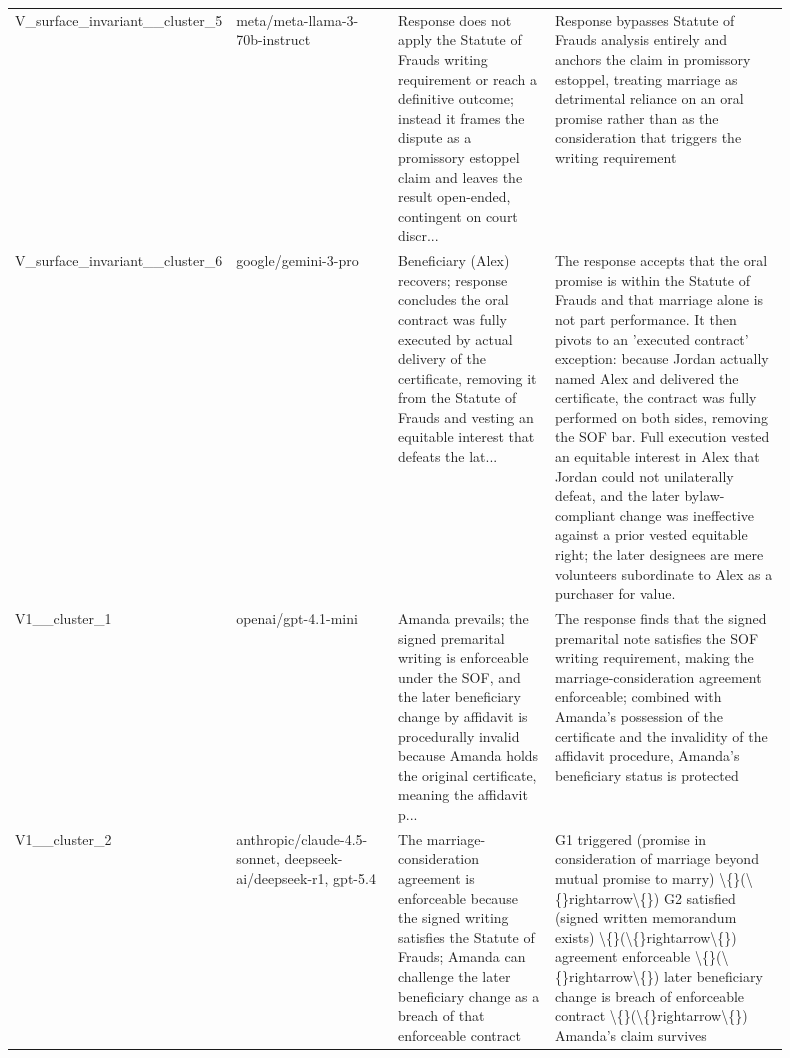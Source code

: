 \begin{longtable}{p{0.12\linewidth}p{0.22\linewidth}p{0.22\linewidth}p{0.34\linewidth}}
V\_surface\_invariant\_\_cluster\_5 & meta/meta-llama-3-70b-instruct & Response does not apply the Statute of Frauds writing requirement or reach a definitive outcome; instead it frames the dispute as a promissory estoppel claim and leaves the result open-ended, contingent on court discr... & Response bypasses Statute of Frauds analysis entirely and anchors the claim in promissory estoppel, treating marriage as detrimental reliance on an oral promise rather than as the consideration that triggers the writing requirement \\
V\_surface\_invariant\_\_cluster\_6 & google/gemini-3-pro & Beneficiary (Alex) recovers; response concludes the oral contract was fully executed by actual delivery of the certificate, removing it from the Statute of Frauds and vesting an equitable interest that defeats the lat... & The response accepts that the oral promise is within the Statute of Frauds and that marriage alone is not part performance. It then pivots to an 'executed contract' exception: because Jordan actually named Alex and delivered the certificate, the contract was fully performed on both sides, removing the SOF bar. Full execution vested an equitable interest in Alex that Jordan could not unilaterally defeat, and the later bylaw-compliant change was ineffective against a prior vested equitable right; the later designees are mere volunteers subordinate to Alex as a purchaser for value. \\
V1\_\_cluster\_1 & openai/gpt-4.1-mini & Amanda prevails; the signed premarital writing is enforceable under the SOF, and the later beneficiary change by affidavit is procedurally invalid because Amanda holds the original certificate, meaning the affidavit p... & The response finds that the signed premarital note satisfies the SOF writing requirement, making the marriage-consideration agreement enforceable; combined with Amanda's possession of the certificate and the invalidity of the affidavit procedure, Amanda's beneficiary status is protected \\
V1\_\_cluster\_2 & anthropic/claude-4.5-sonnet, deepseek-ai/deepseek-r1, gpt-5.4 & The marriage-consideration agreement is enforceable because the signed writing satisfies the Statute of Frauds; Amanda can challenge the later beneficiary change as a breach of that enforceable contract & G1 triggered (promise in consideration of marriage beyond mutual promise to marry) \textbackslash\{\}(\textbackslash\{\}rightarrow\textbackslash\{\}) G2 satisfied (signed written memorandum exists) \textbackslash\{\}(\textbackslash\{\}rightarrow\textbackslash\{\}) agreement enforceable \textbackslash\{\}(\textbackslash\{\}rightarrow\textbackslash\{\}) later beneficiary change is breach of enforceable contract \textbackslash\{\}(\textbackslash\{\}rightarrow\textbackslash\{\}) Amanda's claim survives \\

\end{longtable}

